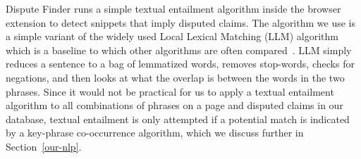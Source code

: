 Dispute Finder runs a simple textual entailment algorithm inside the browser extension to detect snippets that imply disputed claims. The algorithm we use is a simple variant of the widely used Local Lexical Matching (LLM) algorithm~\cite{Jijkoun2006} which is a baseline to which other algorithms are often compared~\cite{Braz}. LLM simply reduces a sentence to a bag of lemmatized words, removes stop-words, checks for negations, and then looks at what the overlap is between the words in the two phrases. Since it would not be practical for us to apply a textual entailment algorithm to all combinations of phrases on a page and disputed claims in our database, textual entailment is only attempted if a potential match is indicated by a key-phrase co-occurrence algorithm, which we discuss further in Section~\ref{our-nlp}.


%




